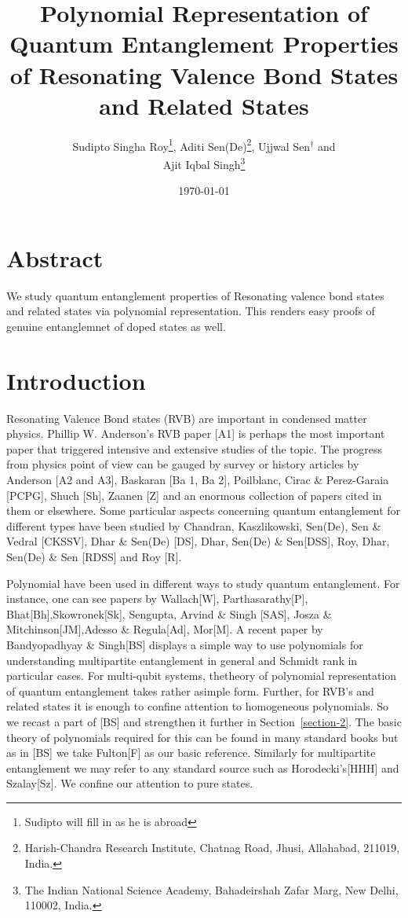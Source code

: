 \documentclass[a4paper,12pt]{article}
\theoremstyle{definition}
\theoremstyle{underlinethm}
\theoremstyle{definition}
\begin{document}
\title{Polynomial Representation of Quantum Entanglement Properties of Resonating Valence Bond States and Related States}
\author{Sudipto Singha Roy\footnote{Sudipto will fill in as he is abroad}, Aditi Sen(De){\footnote{Harish-Chandra Research Institute, Chatnag Road, Jhusi, Allahabad, 211019, India.}}, Ujjwal Sen{$^\dagger$} and\\ Ajit Iqbal Singh{\footnote{The Indian National Science Academy, Bahadeirshah Zafar Marg, New Delhi, 110002, India.}}}

\date{\today}

\maketitle

\section*{Abstract}

We study quantum entanglement properties of Resonating valence bond states and related states via polynomial representation. This renders easy proofs of genuine entanglemnet of doped states as well.


\section{Introduction}\label{section-1}

Resonating Valence Bond states (RVB) are important in condensed matter physics. Phillip W. Anderson's RVB paper [A1] is perhaps the most important paper that triggered intensive and extensive studies of the topic. The progress from physics point of view can be gauged by survey or history articles by Anderson [A2 and A3], Baskaran [Ba 1, Ba 2], Poilblanc, Cirac \& Perez-Garaia [PCPG], Shuch [Sh], Zaanen [Z] and an enormous collection of papers cited in them or elsewhere. Some particular aspects concerning quantum entanglement for different types have been studied by Chandran, Kaszlikowski, Sen(De), Sen \& Vedral [CKSSV], Dhar \& Sen(De) [DS], Dhar, Sen(De) \& Sen[DSS], Roy, Dhar, Sen(De) \& Sen [RDSS] and Roy [R].


Polynomial have been used in different ways to study quantum entanglement. For instance, one can see papers by Wallach[W], Parthasarathy[P], Bhat[Bh],\break Skowronek[Sk], Sengupta, Arvind \& Singh [SAS], Josza \& Mitchinson[JM],\break Adesso \& Regula[Ad], Mor[M]. A recent paper by Bandyopadhyay \& Singh[BS] displays a simple way to use polynomials for understanding multipartite entanglement in general and Schmidt rank in particular cases. For multi-qubit systems, the\break theory of polynomial representation of quantum entanglement takes rather a\break simple form. Further, for RVB's and related states it is enough to confine attention to homogeneous polynomials. So we recast a part of [BS] and strengthen it further in Section~\eqref{section-2}. The basic theory of polynomials required for this can be found in many standard books but as in [BS] we take Fulton[F] as our basic reference. Similarly for multipartite  entanglement we may refer to any standard source such as Horodecki's[HHH] and Szalay[Sz]. We confine our attention to pure states.
\end{document}
